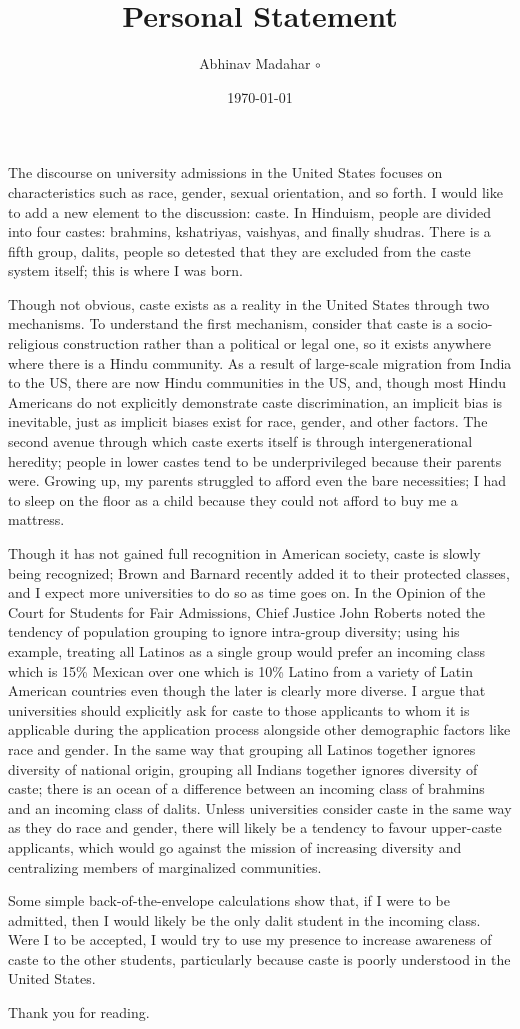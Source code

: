 \documentclass{amsart}
\title{Personal Statement}
\author{Abhinav Madahar $\circ$ {\normalfont {\devanagari अभिनव मदहर}}}
\date{\today}
\begin{document}
\maketitle

The discourse on university admissions in the United States focuses on characteristics such as race, gender, sexual orientation, and so forth.
I would like to add a new element to the discussion: caste.
In Hinduism, people are divided into four castes: brahmins, kshatriyas, vaishyas, and finally shudras.
There is a fifth group, dalits, people so detested that they are excluded from the caste system itself; this is where I was born.

Though not obvious, caste exists as a reality in the United States through two mechanisms.
To understand the first mechanism, consider that caste is a socio-religious construction rather than a political or legal one, so it exists anywhere where there is a Hindu community.
As a result of large-scale migration from India to the US, there are now Hindu communities in the US, and, though most Hindu Americans do not explicitly demonstrate caste discrimination, an implicit bias is inevitable, just as implicit biases exist for race, gender, and other factors.
The second avenue through which caste exerts itself is through intergenerational heredity; people in lower castes tend to be underprivileged because their parents were.
Growing up, my parents struggled to afford even the bare necessities; I had to sleep on the floor as a child because they could not afford to buy me a mattress.

Though it has not gained full recognition in American society, caste is slowly being recognized; Brown and Barnard recently added it to their protected classes, and I expect more universities to do so as time goes on.
In the Opinion of the Court for Students for Fair Admissions, Chief Justice John Roberts noted the tendency of population grouping to ignore intra-group diversity; using his example, treating all Latinos as a single group would prefer an incoming class which is 15\% Mexican over one which is 10\% Latino from a variety of Latin American countries even though the later is clearly more diverse.
I argue that universities should explicitly ask for caste to those applicants to whom it is applicable during the application process alongside other demographic factors like race and gender.
In the same way that grouping all Latinos together ignores diversity of national origin, grouping all Indians together ignores diversity of caste; there is an ocean of a difference between an incoming class of brahmins and an incoming class of dalits.
Unless universities consider caste in the same way as they do race and gender, there will likely be a tendency to favour upper-caste applicants, which would go against the mission of increasing diversity and centralizing members of marginalized communities.

Some simple back-of-the-envelope calculations show that, if I were to be admitted, then I would likely be the only dalit student in the incoming class.
Were I to be accepted, I would try to use my presence to increase awareness of caste to the other students, particularly because caste is poorly understood in the United States.

Thank you for reading.
\end{document}
